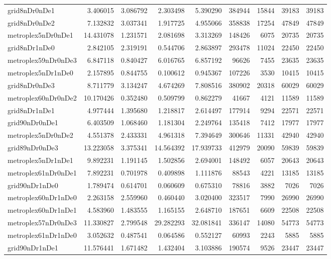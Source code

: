 \begin{longtable}{|l|r|r|r|r|r|r|r|r|}
grid8nDr0nDe1 & 3.406015 & 3.086792 & 2.303498 & 5.390290 & 384944 & 15844 & 39183 & 39183 \\
grid8nDr0nDe2 & 7.132832 & 3.037341 & 1.917725 & 4.955066 & 358838 & 17254 & 47849 & 47849 \\
metroplex5nDr0nDe1 & 14.431078 & 1.231571 & 2.081698 & 3.313269 & 148426 & 6075 & 20735 & 20735 \\
grid8nDr1nDe0 & 2.842105 & 2.319191 & 0.544706 & 2.863897 & 293478 & 11024 & 22450 & 22450 \\
metroplex59nDr0nDe3 & 6.847118 & 0.840427 & 6.016765 & 6.857192 & 96626 & 7455 & 23635 & 23635 \\
metroplex5nDr1nDe0 & 2.157895 & 0.844755 & 0.100612 & 0.945367 & 107226 & 3530 & 10415 & 10415 \\
grid8nDr0nDe3 & 8.711779 & 3.134247 & 4.674269 & 7.808516 & 380902 & 20318 & 60029 & 60029 \\
metroplex60nDr0nDe2 & 10.170426 & 0.352480 & 0.509799 & 0.862279 & 41667 & 4121 & 11589 & 11589 \\
grid8nDr1nDe1 & 4.977444 & 1.395680 & 1.218817 & 2.614497 & 177914 & 9294 & 22571 & 22571 \\
grid90nDr0nDe1 & 6.403509 & 1.068460 & 1.181304 & 2.249764 & 135418 & 7412 & 17977 & 17977 \\
metroplex5nDr0nDe2 & 4.551378 & 2.433331 & 4.961318 & 7.394649 & 300646 & 11331 & 42940 & 42940 \\
grid89nDr0nDe3 & 13.223058 & 3.375341 & 14.564392 & 17.939733 & 412979 & 20090 & 59839 & 59839 \\
metroplex5nDr1nDe1 & 9.892231 & 1.191145 & 1.502856 & 2.694001 & 148492 & 6057 & 20643 & 20643 \\
metroplex61nDr0nDe1 & 7.892231 & 0.701978 & 0.409898 & 1.111876 & 88543 & 4221 & 13185 & 13185 \\
grid90nDr1nDe0 & 1.789474 & 0.614701 & 0.060609 & 0.675310 & 78816 & 3882 & 7026 & 7026 \\
metroplex60nDr1nDe0 & 2.263158 & 2.559960 & 0.460440 & 3.020400 & 323517 & 7990 & 26990 & 26990 \\
metroplex60nDr1nDe1 & 4.583960 & 1.483555 & 1.165155 & 2.648710 & 187651 & 6609 & 22508 & 22508 \\
metroplex57nDr0nDe3 & 11.330827 & 2.799548 & 29.282293 & 32.081841 & 336147 & 14080 & 54773 & 54773 \\
metroplex61nDr1nDe0 & 3.052632 & 0.487541 & 0.064586 & 0.552127 & 60993 & 2243 & 5885 & 5885 \\
grid90nDr1nDe1 & 11.576441 & 1.671482 & 1.432404 & 3.103886 & 190574 & 9526 & 23447 & 23447 \\

\end{longtable}
